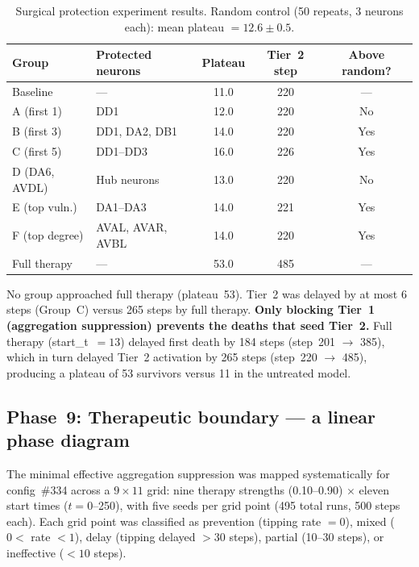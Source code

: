 \documentclass[12pt,a4paper]{article}
\begin{document}
\begin{table}[H]
\centering
\caption{Surgical protection experiment results. Random control (50 repeats, 3 neurons each):
mean plateau $= 12.6 \pm 0.5$.}
\label{tab:protection}
\begin{tabular}{lp{3.5cm}ccc}
\toprule
\textbf{Group} & \textbf{Protected neurons} & \textbf{Plateau}
  & \textbf{Tier~2 step} & \textbf{Above random?}\\
\midrule
Baseline      & ---              & 11.0 & 220 & ---\\
A (first 1)   & DD1              & 12.0 & 220 & No\\
B (first 3)   & DD1, DA2, DB1    & 14.0 & 220 & Yes\\
C (first 5)   & DD1--DD3         & 16.0 & 226 & Yes\\
D (DA6, AVDL) & Hub neurons      & 13.0 & 220 & No\\
E (top vuln.) & DA1--DA3         & 14.0 & 221 & Yes\\
F (top degree)& AVAL, AVAR, AVBL & 14.0 & 220 & Yes\\
Full therapy  & ---              & 53.0 & 485 & ---\\
\bottomrule
\end{tabular}
\end{table}

No group approached full therapy (plateau~53). Tier~2 was delayed by at most 6 steps (Group~C)
versus 265 steps by full therapy. \textbf{Only blocking Tier~1 (aggregation suppression)
prevents the deaths that seed Tier~2.} Full therapy (start\_t~$= 13$) delayed first death by
184 steps (step~201 $\to$ 385), which in turn delayed Tier~2 activation by 265 steps
(step~220 $\to$ 485), producing a plateau of 53 survivors versus 11 in the untreated model.

\subsection{Phase~9: Therapeutic boundary --- a linear phase diagram}

The minimal effective aggregation suppression was mapped systematically for config~\#334 across
a $9 \times 11$ grid: nine therapy strengths (0.10--0.90) $\times$ eleven start times ($t =
0$--250), with five seeds per grid point (495 total runs, 500 steps each). Each grid point was
classified as prevention (tipping rate $= 0$), mixed ($0 <$ rate $< 1$), delay (tipping
delayed $> 30$ steps), partial (10--30 steps), or ineffective ($< 10$ steps).
\end{document}
